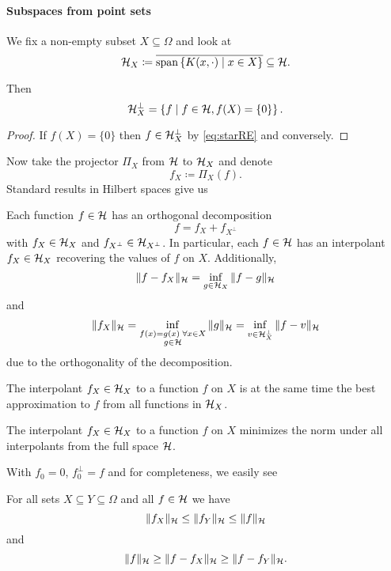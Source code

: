 \documentclass[../skript.tex]{subfiles}
\begin{document}
\paragraph*{Subspaces from point sets}
We fix a non-empty subset $X \subseteq \Omega$ and look at
\[
	\mathcal{H}_X \coloneqq \overline{\operatorname*{span} \left\{ K(x, \cdot) \mid x \in X \right\}} \subseteq \mathcal{H}.
\]
\begin{theorem} %
\label{thm:13}
Then
\[
	\mathcal{H}_X^\perp = \left\{ f \mid f \in \mathcal{H}, f(X) = \{ 0 \} \right\}.
\]
\end{theorem}
\begin{proof}
If $f(X) = \{ 0 \}$ then $f \in \mathcal{H}_X^\perp$ by \cref{eq:starRE} and conversely.
\end{proof}
Now take the projector $\Pi_X$ from $\mathcal{H}$ to $\mathcal{H}_X$ and denote
\[
	f_X \coloneqq \Pi_X(f).
\]
Standard results in Hilbert spaces give us
\begin{theorem} %
\label{thm:14}
Each function $f \in \mathcal{H}$ has an orthogonal decomposition
\[
	f = f_X + f_{X^\perp}
\]
with $f_X \in \mathcal{H}_X$ and $f_{X^\perp} \in \mathcal{H}_{X^\perp}$.
In particular, each $f \in \mathcal{H}$ has an interpolant $f_X \in \mathcal{H}_X$ recovering the values of $f$ on $X$.
Additionally,
\[
	\| f - f_X \|_{\mathcal{H}} = \inf_{g \in \mathcal{H}_X} \| f - g \|_{\mathcal{H}}
\]
and 
\[
	\| f_X \|_{\mathcal{H}} = \inf_{\substack{f(x) = g(x) \; \forall x \in X \\ g \in \mathcal{H}}} \| g \|_{\mathcal{H}} = \inf_{v \in \mathcal{H}_X^\perp} \| f - v \|_{\mathcal{H}}
\]
due to the orthogonality of the decomposition.
\end{theorem}
\begin{corollary} %
\label{thm:15}
The interpolant $f_X \in \mathcal{H}_X$ to a function $f$ on $X$ is at the same time the best approximation to $f$ from all functions in $\mathcal{H}_X$.
\end{corollary}
\begin{corollary} %
\label{thm:16}
The interpolant $f_X \in \mathcal{H}_X$ to a function $f$ on $X$ minimizes the norm under all interpolants from the full space $\mathcal{H}$.
\end{corollary}
With $f_0 = 0$, $f_0^\perp = f$ and 
for completeness, we easily see
\begin{corollary} %
\label{thm:17}
For all sets $X \subseteq Y \subseteq \Omega$ and all $f \in \mathcal{H}$ we have
\[
	\| f_X \|_{\mathcal{H}} \leq \| f_Y \|_{\mathcal{H}} \leq \| f \|_{\mathcal{H}}
\]
and
\[
	\| f \|_{\mathcal{H}} \geq \| f - f_X \|_{\mathcal{H}} \geq \| f - f_Y \|_{\mathcal{H}}.
\]
\end{corollary}
\end{document}
